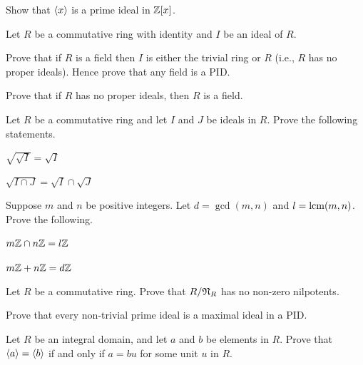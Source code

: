 \begin{problem}
    Show that $\left\langle x\right\rangle$ is a prime ideal in $\mathbb{Z}[x]$.
\end{problem}

\begin{problem}\label{problem-ring-is-field-iff-no-proper-ideals}
    Let $R$ be a commutative ring with identity and $I$ be an ideal of $R$.
    \begin{partquestions}{\alph*}
        \item Prove that if $R$ is a field then $I$ is either the trivial ring or $R$ (i.e., $R$ has no proper ideals). Hence prove that any field is a PID.
        \item Prove that if $R$ has no proper ideals, then $R$ is a field.
    \end{partquestions}
\end{problem}

\begin{problem}
    Let $R$ be a commutative ring and let $I$ and $J$ be ideals in $R$. Prove the following statements.
    \begin{partquestions}{\alph*}
        \item $\sqrt{\sqrt{I}} = \sqrt{I}$
        \item $\sqrt{I \cap J} = \sqrt{I} \cap \sqrt{J}$
    \end{partquestions}
\end{problem}

\begin{problem}
    Suppose $m$ and $n$ be positive integers. Let $d = \gcd(m,n)$ and $l = \mathrm{lcm}(m,n)$. Prove the following.
    \begin{partquestions}{\alph*}
        \item $m\mathbb{Z} \cap n\mathbb{Z} = l\mathbb{Z}$
        \item $m\mathbb{Z} + n\mathbb{Z} = d\mathbb{Z}$
    \end{partquestions}
\end{problem}

\begin{problem}
    Let $R$ be a commutative ring. Prove that $R / \mathfrak{N}_{R}$ has no non-zero nilpotents.
\end{problem}

\begin{problem}
    Prove that every non-trivial prime ideal is a maximal ideal in a PID.
\end{problem}

\begin{problem}
    Let $R$ be an integral domain, and let $a$ and $b$ be elements in $R$. Prove that $\left\langle a\right\rangle = \left\langle b\right\rangle$ if and only if $a = bu$ for some unit $u$ in $R$.
\end{problem}


